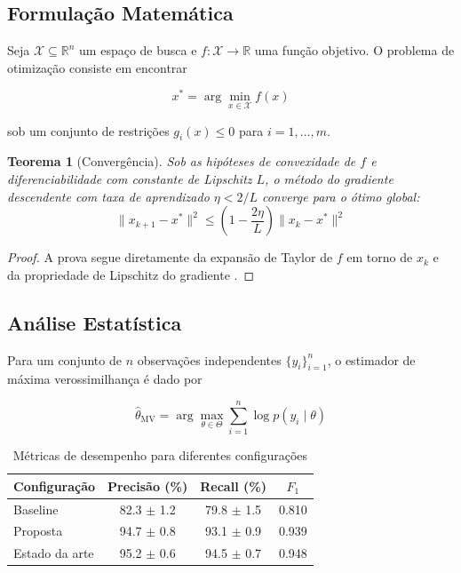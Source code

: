 \documentclass[12pt,a4paper]{article}
\theoremstyle{plain}
\newtheorem{theorem}{Teorema}[section]
\theoremstyle{definition}
\theoremstyle{remark}
\newcommand{\R}{\mathbb{R}}
\begin{document}
\subsection{Formula\c{c}\~ao Matem\'atica}

Seja $\mathcal{X} \subseteq \R^n$ um espa\c{c}o de busca e
$f: \mathcal{X} \to \R$ uma fun\c{c}\~ao objetivo. O problema de
otimiza\c{c}\~ao consiste em encontrar

\begin{equation}
    x^* = \arg\min_{x \in \mathcal{X}} f(x)
    \label{eq:otim}
\end{equation}

\noindent sob um conjunto de restri\c{c}\~oes $g_i(x) \leq 0$ para
$i = 1, \dots, m$.

\begin{theorem}[Converg\^encia]
\label{thm:conv}
Sob as hip\'oteses de convexidade de $f$ e diferenciabilidade
com constante de Lipschitz $L$, o m\'etodo do gradiente descendente
com taxa de aprendizado $\eta < 2/L$ converge para o \'otimo global:
\begin{equation}
    \|x_{k+1} - x^*\|^2 \leq \left(1 - \frac{2\eta}{L}\right)
    \|x_k - x^*\|^2
    \label{eq:conv_rate}
\end{equation}
\end{theorem}

\begin{proof}
A prova segue diretamente da expans\~ao de Taylor de $f$ em torno de
$x_k$ e da propriedade de Lipschitz do gradiente \cite{Boyd2004Convex}.
\end{proof}

\subsection{An\'alise Estat\'istica}

Para um conjunto de $n$ observa\c{c}\~oes independentes $\{y_i\}_{i=1}^n$,
o estimador de m\'axima verossimilhan\c{c}a \'e dado por

\begin{equation}
    \hat{\theta}_{\text{MV}} = \arg\max_{\theta \in \Theta}
    \sum_{i=1}^n \log p(y_i \mid \theta)
    \label{eq:mv}
\end{equation}

\begin{table}[htbp]
\centering
\caption{M\'etricas de desempenho para diferentes configura\c{c}\~oes}
\label{tab:metricas}
\begin{tabular}{lccc}
\toprule
Configura\c{c}\~ao & Precis\~ao (\%) & Recall (\%) & $F_1$ \\
\midrule
Baseline       & 82.3 $\pm$ 1.2 & 79.8 $\pm$ 1.5 & 0.810 \\
Proposta       & 94.7 $\pm$ 0.8 & 93.1 $\pm$ 0.9 & 0.939 \\
Estado da arte & 95.2 $\pm$ 0.6 & 94.5 $\pm$ 0.7 & 0.948 \\
\bottomrule
\end{tabular}
\end{table}
\end{document}
